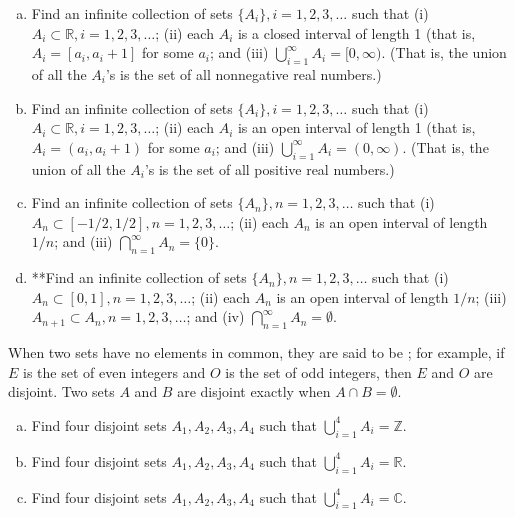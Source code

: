 \begin{exercise}\label{exercise:sets:15}
\begin{enumerate}[(a)]
\item
Find an infinite collection of sets $\{A_i\}, i = 1,2,3,\ldots$ such that (i) $A_i \subset {\mathbb R}, i = 1,2,3, \dots$; (ii)
 each $A_i$ is a closed  interval of length 1 (that is, $A_i = [a_i, a_i+1]$ for some $a_i$; and (iii) $\bigcup_{i = 1}^{\infty} A_{i} = [0, \infty)$. (That is, the union of all the $A_i$'s is the set of all nonnegative real numbers.)
\item
Find an infinite collection of sets $\{A_i\}, i = 1,2,3,\ldots$ such that (i) $A_i \subset {\mathbb R}, i = 1,2,3, \dots$; (ii)
 each $A_i$ is an open  interval of length 1 (that is, $A_i = (a_i, a_i+1)$ for some $a_i$; and (iii) $\bigcup_{i = 1}^{\infty} A_{i} = (0, \infty)$. (That is, the union of all the $A_i$'s is the set of all positive real numbers.)
\item
Find an infinite collection of sets $\{A_n\}, n = 1,2,3,\ldots$ such that (i) $A_n \subset  [-1/2,1/2], n = 1,2,3, \dots$; (ii)
 each $A_n$ is an open interval of length $1/n$; and (iii) $\bigcap_{n = 1}^{\infty} A_{n} = \{0\}$.
 \item
**Find an infinite collection of sets $\{A_n\}, n = 1,2,3,\ldots$ such that (i) $A_n \subset [0,1], n = 1,2,3, \dots$; (ii)
 each $A_n$ is an open interval of length $1/n$; (iii) $A_{n+1} \subset A_{n}, n = 1,2,3, \dots$; and (iv) $\bigcap_{n = 1}^{\infty} A_{n} = \emptyset$.
\end{enumerate}
\end{exercise}

When two sets have no elements in common, they are said to be ; for example, if $E$ is the set of even integers and $O$ is the set of odd integers, then $E$ and $O$ are disjoint.  Two sets $A$ and $B$ are disjoint exactly when $A \cap B = \emptyset$. 

\begin{exercise}\label{exercise:sets:16}
\begin{enumerate}[(a)]
\item
Find four disjoint sets $A_1, A_2, A_3, A_4$ such that $\bigcup_{i = 1}^{4} A_i = {\mathbb Z}$.
\item
Find four disjoint sets $A_1, A_2, A_3, A_4$ such that $\bigcup_{i = 1}^{4} A_i = {\mathbb R}$.
\item
Find four disjoint sets $A_1, A_2, A_3, A_4$ such that $\bigcup_{i = 1}^{4} A_i = {\mathbb C}$.
\end{enumerate}
\end{exercise} 


